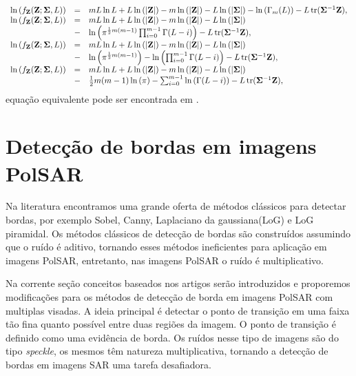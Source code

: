\begin{equation}\label{cap_acf_12}
\begin{array}{cll}
	\ln{\left(f_{\mathbf{Z}}(\mathbf{Z};\mathbf{\Sigma},L)\right)}&=&mL\ln{L}+L\ln{\left(|\mathbf{Z}|\right)}-m\ln{\left(|\mathbf{Z}|\right)} - L\ln{\left(|\mathbf{\Sigma}|\right)}-\ln{\left(\Gamma_m(L)\right)}-L\operatorname{tr}(\mathbf{\Sigma}^{-1}\mathbf{Z}), \\
	\ln{\left(f_{\mathbf{Z}}(\mathbf{Z};\mathbf{\Sigma},L)\right)}&=&mL\ln{L}+L\ln{\left(|\mathbf{Z}|\right)}-m\ln{\left(|\mathbf{Z}|\right)} - L\ln{\left(|\mathbf{\Sigma}|\right)}\\
	&-&\ln{\left(\pi^{\frac{1}{2}m(m-1)} \prod_{i=0}^{m-1}\Gamma(L-i)\right)}-L\operatorname{tr}(\mathbf{\Sigma}^{-1}\mathbf{Z}),\\
	\ln{\left(f_{\mathbf{Z}}(\mathbf{Z};\mathbf{\Sigma},L)\right)}&=&mL\ln{L}+L\ln{\left(|\mathbf{Z}|\right)}-m\ln{\left(|\mathbf{Z}|\right)} - L\ln{\left(|\mathbf{\Sigma}|\right)}\\
        &-&\ln{\left(\pi^{\frac{1}{2}m(m-1)}\right)}-\ln{\left( \prod_{i=0}^{m-1}\Gamma(L-i)\right)}-L\operatorname{tr}(\mathbf{\Sigma}^{-1}\mathbf{Z}), \\
	\ln{\left(f_{\mathbf{Z}}(\mathbf{Z};\mathbf{\Sigma},L)\right)}&=&mL\ln{L}+L\ln{\left(|\mathbf{Z}|\right)}-m\ln{\left(|\mathbf{Z}|\right)} - L\ln{\left(|\mathbf{\Sigma}|\right)}\\
        &-&\frac{1}{2}m(m-1)\ln{\left(\pi\right)}-\sum_{i=0}^{m-1}\ln{\left(\Gamma(L-i)\right)}-L\operatorname{tr}(\mathbf{\Sigma}^{-1}\mathbf{Z}),\\
\end{array}
\end{equation}
equação equivalente pode ser encontrada em \citep{fnc2011}.

\section{Detecção de bordas em imagens PolSAR}\label{cap_acf_sec2}

Na literatura encontramos uma grande oferta de métodos clássicos para detectar bordas, por exemplo Sobel, Canny, Laplaciano da gaussiana(LoG) e LoG piramidal. Os métodos clássicos de detecção de bordas são construídos assumindo que o ruído é aditivo, tornando esses métodos ineficientes para aplicação em imagens PolSAR, entretanto, nas imagens PolSAR o ruído é multiplicativo. 

Na corrente seção conceitos baseados nos artigos \citet{nhfc, gmbf} serão introduzidos e proporemos modificações para os métodos de detecção de borda em imagens PolSAR com multiplas visadas. A ideia principal é detectar o ponto de transição em uma faixa tão fina quanto possível entre duas regiões da imagem. O ponto de transição é definido como uma evidência de borda. Os ruídos nesse tipo de imagens são do tipo \textit{speckle}, os mesmos têm natureza multiplicativa, tornando a detecção de bordas em imagens SAR uma tarefa desafiadora.

